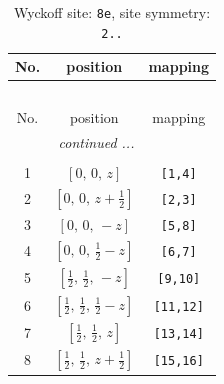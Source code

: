 \documentclass[fleqn,8pt]{jsarticle}
\begin{document}
\renewcommand{\arraystretch}{1.2}
\begin{longtable}{ccc}
\caption{Wyckoff site: {\tt 8e}, site symmetry: {\tt 2..}}
 \\
 \hline \hline
No. & position & mapping \\ \hline \endfirsthead

\multicolumn{2}{l}{\tablename\ \thetable{}} \\
 \hline \hline
No. & position & mapping \\ \hline \endhead

 \hline \hline
\multicolumn{2}{r}{\footnotesize\it continued ...} \\ \endfoot

 \hline \hline
\multicolumn{2}{r}{} \\ \endlastfoot

1 & $\left[ 0,\, 0,\, z \right]$ & {\tt [1,4]} \\ \hline
2 & $\left[ 0,\, 0,\, z + \frac{1}{2} \right]$ & {\tt [2,3]} \\ \hline
3 & $\left[ 0,\, 0,\, - z \right]$ & {\tt [5,8]} \\ \hline
4 & $\left[ 0,\, 0,\, \frac{1}{2} - z \right]$ & {\tt [6,7]} \\ \hline
5 & $\left[ \frac{1}{2},\, \frac{1}{2},\, - z \right]$ & {\tt [9,10]} \\ \hline
6 & $\left[ \frac{1}{2},\, \frac{1}{2},\, \frac{1}{2} - z \right]$ & {\tt [11,12]} \\ \hline
7 & $\left[ \frac{1}{2},\, \frac{1}{2},\, z \right]$ & {\tt [13,14]} \\ \hline
8 & $\left[ \frac{1}{2},\, \frac{1}{2},\, z + \frac{1}{2} \right]$ & {\tt [15,16]} \\
\end{longtable}
\renewcommand{\arraystretch}{1.2}
\end{document}
